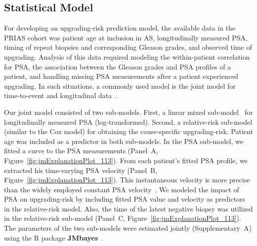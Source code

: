 \subsection{Statistical Model}
For developing an upgrading-risk prediction model, the available data in the PRIAS cohort was patient age at inclusion in AS, longitudinally measured PSA, timing of repeat biopsies and corresponding Gleason grades, and observed time of upgrading. Analysis of this data required modeling the within-patient correlation for PSA, the association between the Gleason grades and PSA profiles of a patient, and handling missing PSA measurements after a patient experienced upgrading. In such situations, a commonly used model is the joint model for time-to-event and longitudinal data~\citep{tomer2019,coley2017prediction,rizopoulos2012joint}.

Our joint model consisted of two sub-models. First, a linear mixed sub-model~\citep{laird1982random} for longitudinally measured PSA (log-transformed). Second, a relative-risk sub-model (similar to the Cox model) for obtaining the cause-specific upgrading-risk. Patient age was included as a predictor in both sub-models. In the PSA sub-model, we fitted a curve to the PSA measurements (Panel~A, Figure~\ref{fig:jmExplanationPlot_113}). From each patient's fitted PSA profile, we extracted his time-varying PSA velocity (Panel~B, Figure~\ref{fig:jmExplanationPlot_113}). This instantaneous velocity is more precise than the widely employed constant PSA velocity~\citep{vickers2009psavelocity}. We modeled the impact of PSA on upgrading-risk by including fitted PSA value and velocity as predictors in the relative-risk model. Also, the time of the latest negative biopsy was utilized in the relative-risk sub-model (Panel~C, Figure~\ref{fig:jmExplanationPlot_113}). The parameters of the two sub-models were estimated jointly (Supplementary~A) using the R package \textbf{JMbayes}~\citep{rizopoulosJMbayes}. 

